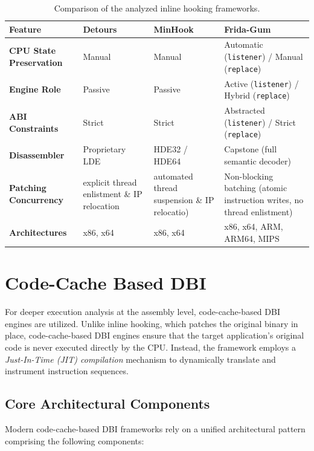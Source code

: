 \begin{table}[H]
	\centering
	\small
	\begin{tabular}{p{4.5cm}p{3.3cm}p{3.3cm}p{4.2cm}}
		\toprule
		\textbf{Feature} & \textbf{Detours} & \textbf{MinHook} & \textbf{Frida-Gum} \\
		\midrule
		\textbf{CPU State Preservation} & Manual & Manual & Automatic (\texttt{listener}) / Manual (\texttt{replace}) \\
		\addlinespace
		\textbf{Engine Role} & Passive & Passive & Active (\texttt{listener}) /  Hybrid (\texttt{replace}) \\
		\addlinespace
		\textbf{ABI Constraints} & Strict & Strict & Abstracted (\texttt{listener}) / Strict (\texttt{replace}) \\
		\addlinespace
		\textbf{Disassembler} & Proprietary LDE & HDE32 / HDE64 & Capstone (full semantic decoder) \\
		\addlinespace
		\textbf{Patching Concurrency} & explicit thread enlistment \& \ac{IP} relocation & automated thread suspension \& \ac{IP} relocatio) & Non-blocking batching (atomic instruction writes, no thread enlistment) \\
		\addlinespace
		\textbf{Architectures} & x86, x64 & x86, x64 & x86, x64, ARM, ARM64, MIPS \\
		\bottomrule
	\end{tabular}
	\caption{Comparison of the analyzed inline hooking frameworks.}
	\label{tab:inline_frameworks_comparison}
\end{table}

\section{Code-Cache Based DBI}
\label{sec:code_cache_dbi}

For deeper execution analysis at the assembly level, code-cache-based \ac{DBI} engines are utilized.
Unlike inline hooking, which patches the original binary in place, code-cache-based \ac{DBI} engines ensure that the target application's original code is never executed directly by the CPU.
Instead, the framework employs a \emph{Just-In-Time (JIT) compilation} mechanism to dynamically translate and instrument instruction sequences.
\subsection{Core Architectural Components}
Modern code-cache-based \ac{DBI} frameworks rely on a unified architectural pattern comprising the following components:

